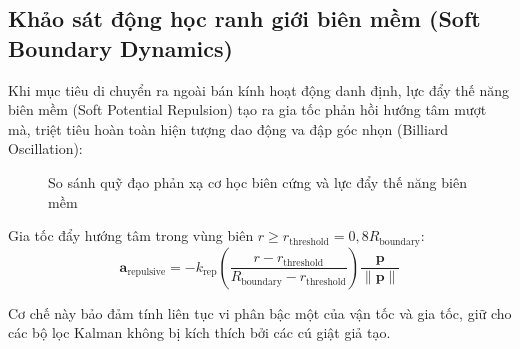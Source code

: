 \subsection{Khảo sát động học ranh giới biên mềm (Soft Boundary Dynamics)}

\hspace{0.5cm} Khi mục tiêu di chuyển ra ngoài bán kính hoạt động danh định, lực đẩy thế năng biên mềm (Soft Potential Repulsion) tạo ra gia tốc phản hồi hướng tâm mượt mà, triệt tiêu hoàn toàn hiện tượng dao động va đập góc nhọn (Billiard Oscillation):

\begin{figure}[H]
\centering
{}
\caption{So sánh quỹ đạo phản xạ cơ học biên cứng và lực đẩy thế năng biên mềm}
\label{fig:boundary-compare}
\end{figure}

Gia tốc đẩy hướng tâm trong vùng biên $r \ge r_{\text{threshold}} = 0{,}8 R_{\text{boundary}}$:
\begin{equation}
\mathbf{a}_{\text{repulsive}} = -k_{\text{rep}} \left( \frac{r - r_{\text{threshold}}}{R_{\text{boundary}} - r_{\text{threshold}}} \right) \frac{\mathbf{p}}{\|\mathbf{p}\|}
\label{eq:soft-repulsion-formula-w13}
\end{equation}

Cơ chế này bảo đảm tính liên tục vi phân bậc một của vận tốc và gia tốc, giữ cho các bộ lọc Kalman không bị kích thích bởi các cú giật giả tạo.

